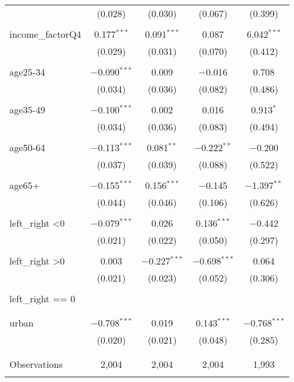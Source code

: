 \begin{tabular}{@{\extracolsep{5pt}}lcccc}
  & (0.028) & (0.030) & (0.067) & (0.399) \\ 
  & & & & \\ 
 income\_factorQ4 & 0.177$^{***}$ & 0.091$^{***}$ & 0.087 & 6.042$^{***}$ \\ 
  & (0.029) & (0.031) & (0.070) & (0.412) \\ 
  & & & & \\ 
 age25-34 & $-$0.090$^{***}$ & 0.009 & $-$0.016 & 0.708 \\ 
  & (0.034) & (0.036) & (0.082) & (0.486) \\ 
  & & & & \\ 
 age35-49 & $-$0.100$^{***}$ & 0.002 & 0.016 & 0.913$^{*}$ \\ 
  & (0.034) & (0.036) & (0.083) & (0.494) \\ 
  & & & & \\ 
 age50-64 & $-$0.113$^{***}$ & 0.081$^{**}$ & $-$0.222$^{**}$ & $-$0.200 \\ 
  & (0.037) & (0.039) & (0.088) & (0.522) \\ 
  & & & & \\ 
 age65+ & $-$0.155$^{***}$ & 0.156$^{***}$ & $-$0.145 & $-$1.397$^{**}$ \\ 
  & (0.044) & (0.046) & (0.106) & (0.626) \\ 
  & & & & \\ 
 left\_right \textless  0 & $-$0.079$^{***}$ & 0.026 & 0.136$^{***}$ & $-$0.442 \\ 
  & (0.021) & (0.022) & (0.050) & (0.297) \\ 
  & & & & \\ 
 left\_right \textgreater  0 & 0.003 & $-$0.227$^{***}$ & $-$0.698$^{***}$ & 0.064 \\ 
  & (0.021) & (0.023) & (0.052) & (0.306) \\ 
  & & & & \\ 
 left\_right == 0 &  &  &  &  \\ 
  &  &  &  &  \\ 
  & & & & \\ 
 urban & $-$0.708$^{***}$ & 0.019 & 0.143$^{***}$ & $-$0.768$^{***}$ \\ 
  & (0.020) & (0.021) & (0.048) & (0.285) \\ 
  & & & & \\ 
\hline \\[-1.8ex] 

Observations & 2,004 & 2,004 & 2,004 & 1,993 \\ 
\hline 
\hline \\[-1.8ex] 
\end{tabular} 